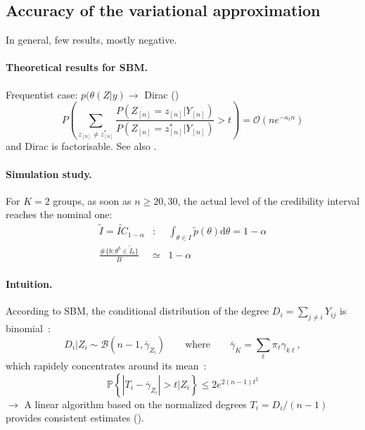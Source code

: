 \documentclass[12pt]{article}
\newcommand{\dd}{\text{d}}
\renewcommand{\Pr}{{\mathbb{P}}}
\newcommand{\pt}{\widetilde{p}}
\begin{document}
\subsection{Accuracy of the variational approximation}

In general, few results, mostly negative.

\paragraph{Theoretical results for SBM.} Frequentist case: $p(\theta(Z|y) \rightarrow$ Dirac (\cite{CDP12})
$$
P\left(\sum_{z_{[n]} \neq z^*_{[n]}} \frac{P(Z_{[n]}=z_{[n]}|Y_{[n]})}{P(Z_{[n]}=z^*_{[n]}|Y_{[n]})} > t\right) = \mathcal{O}(n e^{-\kappa_t n})
$$
and Dirac is factorisable. See also \cite{MaM14}.

\paragraph{Simulation study.} For $K = 2$ groups, as soon as $n \geq 20, 30$, the actual level of the credibility interval reaches the nominal one:
\begin{eqnarray*}
 \widetilde{I} = \widetilde{IC}_{1-\alpha} & : & \int_{\theta \in I} \pt(\theta) \dd \theta = 1-\alpha \\
 \frac{\#\{b: \theta^b \in \widetilde{I}_b\}}{B} & \simeq & 1-\alpha
\end{eqnarray*}


\paragraph{Intuition.} According to SBM, the conditional distribution of the degree $D_i = \sum_{j \neq i} Y_{ij}$ is binomial~:
$$
D_i | Z_i \sim \mathcal{B}(n-1, \overline{\gamma}_{Z_i})
\qquad \text{where} \qquad
\overline{\gamma}_K = \sum_\ell \pi_\ell \gamma_{k \ell},
$$
which rapidely concentrates around its mean~:
$$
\Pr\left\{\left|T_i - \overline{\gamma}_{Z_i}\right| > t | Z_i\right\} \leq 2e^{2(n-1)t^2}
$$
$\longrightarrow$ A linear algorithm based on the normalized degrees $T_i = D_i/(n-1)$ provides consistent estimates (\cite{CDR12}).



\newpage



\end{document}
